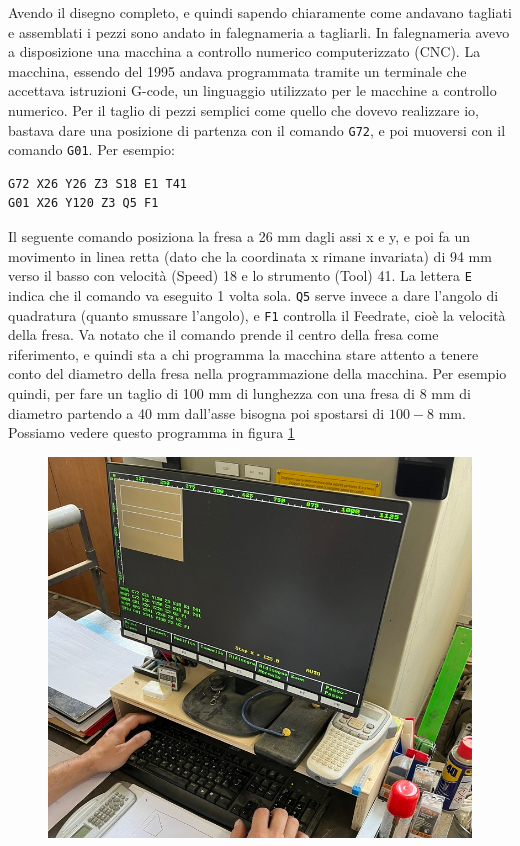 \documentclass{article}
\begin{document}
Avendo il disegno completo, e quindi sapendo chiaramente come andavano tagliati e assemblati i pezzi sono andato in falegnameria a tagliarli.
In falegnameria avevo a disposizione una macchina a controllo numerico computerizzato (CNC).
La macchina, essendo del 1995 andava programmata tramite un terminale che accettava istruzioni G-code, un linguaggio utilizzato per le macchine a controllo numerico.
Per il taglio di pezzi semplici come quello che dovevo realizzare io, bastava dare una posizione di partenza con il comando \verb|G72|, e poi muoversi con il comando \verb|G01|.
Per esempio:
\begin{lstlisting}
G72 X26 Y26 Z3 S18 E1 T41
G01 X26 Y120 Z3 Q5 F1
\end{lstlisting}
Il seguente comando posiziona la fresa a 26 mm dagli assi x e y, e poi fa un movimento in linea retta (dato che la coordinata x rimane invariata) di 94 mm verso il basso con velocità (Speed) 18 e lo strumento (Tool) 41. La lettera \verb|E| indica che il comando va eseguito 1 volta sola.
\verb|Q5| serve invece a dare l'angolo di quadratura (quanto smussare l'angolo), e \verb|F1| controlla il Feedrate, cioè la velocità della fresa.
Va notato che il comando prende il centro della fresa come riferimento, e quindi sta a chi programma la macchina stare attento a tenere conto del diametro della fresa nella programmazione della macchina.
Per esempio quindi, per fare un taglio di 100 mm di lunghezza con una fresa di 8 mm di diametro partendo a 40 mm dall'asse bisogna poi spostarsi di $100 - 8$ mm.
Possiamo vedere questo programma in figura \ref{fig:programma_cnc}

\begin{figure}[htbp]
  \centering
  \includegraphics[width=0.8\linewidth]{./images/programma_cnc.png}
  \caption{}
  \label{fig:programma_cnc}
\end{figure}
\end{document}
